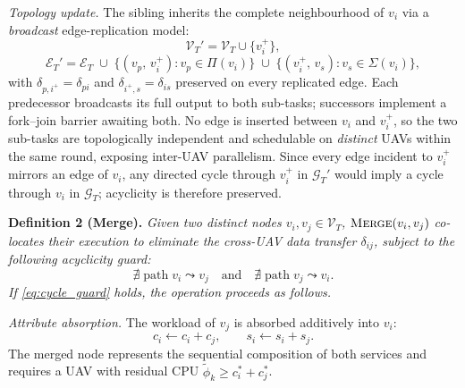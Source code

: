 \smallskip
\noindent\textit{Topology update.}
The sibling inherits the complete neighbourhood of $v_i$ via a
\emph{broadcast} edge-replication model:
\begin{equation}
  \mathcal{V}_T' = \mathcal{V}_T \cup \{v_i^{+}\},
  \label{eq:split_vset}
\end{equation}
\begin{equation}
  \mathcal{E}_T' = \mathcal{E}_T
    \;\cup\; \bigl\{(v_p,\,v_i^{+}): v_p \in \Pi(v_i)\bigr\}
    \;\cup\; \bigl\{(v_i^{+},\,v_s): v_s \in \Sigma(v_i)\bigr\},
  \label{eq:split_edges}
\end{equation}
with $\delta_{p,i^+} = \delta_{pi}$ and $\delta_{i^+,s} = \delta_{is}$
preserved on every replicated edge.
Each predecessor broadcasts its full output to both sub-tasks;
successors implement a fork–join barrier awaiting both.
No edge is inserted between $v_i$ and $v_i^{+}$, so the two sub-tasks
are topologically independent and schedulable on \emph{distinct} UAVs
within the same round, exposing inter-UAV parallelism.
Since every edge incident to $v_i^{+}$ mirrors an edge of $v_i$,
any directed cycle through $v_i^{+}$ in $\mathcal{G}_T'$ would imply
a cycle through $v_i$ in $\mathcal{G}_T$; acyclicity is therefore preserved.

\smallskip
\noindent\textbf{Definition 2 (Merge).}
\emph{Given two distinct nodes $v_i, v_j \in \mathcal{V}_T$,
$\textsc{Merge}(v_i,v_j)$ co-locates their execution to eliminate the
cross-UAV data transfer $\delta_{ij}$, subject to the following
acyclicity guard:
\begin{equation}
  \nexists\;\text{path}\;v_i\!\leadsto\!v_j
  \quad\text{and}\quad
  \nexists\;\text{path}\;v_j\!\leadsto\!v_i.
  \label{eq:cycle_guard}
\end{equation}
If \eqref{eq:cycle_guard} holds, the operation proceeds as follows.}

\smallskip
\noindent\textit{Attribute absorption.}
The workload of $v_j$ is absorbed additively into $v_i$:
\begin{equation}
  c_i \leftarrow c_i + c_j, \qquad s_i \leftarrow s_i + s_j.
  \label{eq:merge_attr}
\end{equation}
The merged node represents the sequential composition of both services
and requires a UAV with residual CPU $\tilde\phi_k \geq c_i^* + c_j^*$.

